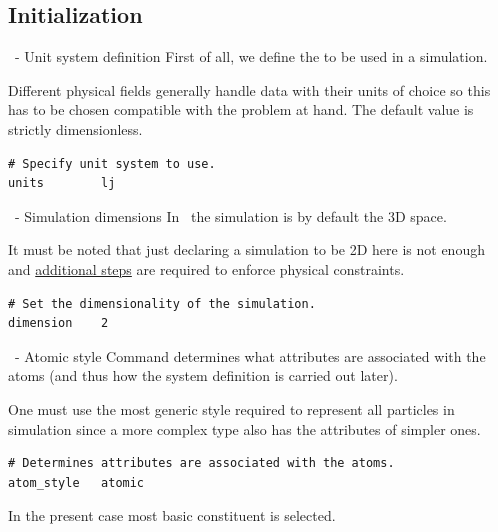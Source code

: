 \subsection{Initialization}

\begin{frame}[fragile]{\secname}{\subsecname\ - Unit system definition}
First of all, we define the  to be used in a simulation.

\vspace{0.5cm}

Different physical fields generally handle data with their units of choice so this has to be chosen compatible with the problem at hand. The default value  is strictly dimensionless.

\vspace{0.5cm}

\begin{lstlisting}[language=LAMMPS,basicstyle=\small]
# Specify unit system to use.
units        lj
\end{lstlisting}
\end{frame}

\begin{frame}[fragile]{\secname}{\subsecname\ - Simulation dimensions}
In \LAMMPS\, the simulation  is by default the 3D space.

\vspace{0.5cm}

It must be noted that just declaring a simulation to be 2D here is not enough and \href{https://docs.lammps.org/Howto_2d.html}{additional steps} are required to enforce physical constraints.

\vspace{0.5cm}

\begin{lstlisting}[language=LAMMPS,basicstyle=\small]
# Set the dimensionality of the simulation.
dimension    2
\end{lstlisting}
\end{frame}

\begin{frame}[fragile]{\secname}{\subsecname\ - Atomic style}
Command  determines what attributes are associated with the atoms (and thus how the system definition is carried out later).

\vspace{0.5cm}

One must use the most generic style required to represent all particles in simulation since a more complex type also has the attributes of simpler ones.

\vspace{0.5cm}

\begin{lstlisting}[language=LAMMPS,basicstyle=\small]
# Determines attributes are associated with the atoms.
atom_style   atomic
\end{lstlisting}

\vspace{0.5cm}
In the present case most basic constituent  is selected.
\end{frame}

